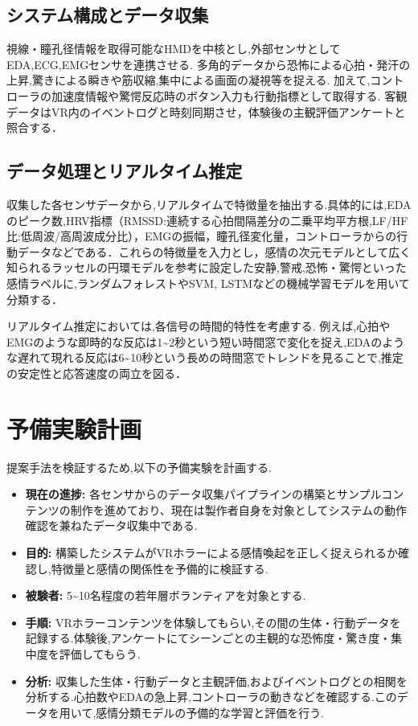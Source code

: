 \documentclass[paper=a4paper,fontsize=10pt,jafontscale=0.925,twocolumn]{jlreq}
\begin{document}
\subsection{システム構成とデータ収集}

視線・瞳孔径情報を取得可能なHMDを中核とし,外部センサとしてEDA,ECG,EMGセンサを連携させる. 多角的データから恐怖による心拍・発汗の上昇,驚きによる瞬きや筋収縮,集中による画面の凝視等を捉える. 加えて,コントローラの加速度情報や驚愕反応時のボタン入力も行動指標として取得する. 客観データはVR内のイベントログと時刻同期させ，体験後の主観評価アンケートと照合する．

\subsection{データ処理とリアルタイム推定}

収集した各センサデータから,リアルタイムで特徴量を抽出する.具体的には,EDAのピーク数,HRV指標（RMSSD:連続する心拍間隔差分の二乗平均平方根,LF/HF比:低周波/高周波成分比），EMGの振幅，瞳孔径変化量，コントローラからの行動データなどである．これらの特徴量を入力とし，感情の次元モデルとして広く知られるラッセルの円環モデル\cite{Russell1980}を参考に設定した安静,警戒,恐怖・驚愕といった感情ラベルに,ランダムフォレストやSVM, LSTMなどの機械学習モデルを用いて分類する．

リアルタイム推定においては,各信号の時間的特性を考慮する. 例えば,心拍やEMGのような即時的な反応は1\textasciitilde2秒という短い時間窓で変化を捉え,EDAのような遅れて現れる反応は6\textasciitilde10秒という長めの時間窓でトレンドを見ることで,推定の安定性と応答速度の両立を図る．

\section{予備実験計画}

提案手法を検証するため,以下の予備実験を計画する.

\begin{itemize}
    \item \textbf{現在の進捗:} 各センサからのデータ収集パイプラインの構築とサンプルコンテンツの制作を進めており、現在は製作者自身を対象としてシステムの動作確認を兼ねたデータ収集中である.
    \item \textbf{目的:} 構築したシステムがVRホラーによる感情喚起を正しく捉えられるか確認し,特徴量と感情の関係性を予備的に検証する.
    \item \textbf{被験者:} 5\textasciitilde10名程度の若年層ボランティアを対象とする.
    \item \textbf{手順:} VRホラーコンテンツを体験してもらい,その間の生体・行動データを記録する.体験後,アンケートにてシーンごとの主観的な恐怖度・驚き度・集中度を評価してもらう.
    \item \textbf{分析:} 収集した生体・行動データと主観評価,およびイベントログとの相関を分析する.心拍数やEDAの急上昇,コントローラの動きなどを確認する.このデータを用いて,感情分類モデルの予備的な学習と評価を行う.
\end{itemize}
\end{document}
